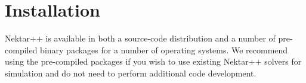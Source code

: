 \chapter{Installation}

Nektar++ is available in both a source-code distribution and a number of
pre-compiled binary packages for a number of operating systems. We recommend
using the pre-compiled packages if you wish to use existing Nektar++ solvers for
simulation and do not need to perform additional code development.






